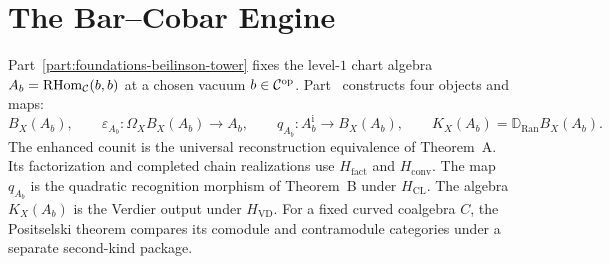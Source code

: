 \documentclass[11pt]{memoir}
\providecommand{\op}{\mathrm{op}}
\begin{document}






%
%
%
%

\part{The Bar–Cobar Engine}
\label{part:bar-cobar-engine}%
\label{part:bar-complex}%
\label{chap:bar-complex}%

\noindent
Part~\ref{part:foundations-beilinson-tower} fixes the level-$1$ chart
algebra
$A_b=\operatorname{RHom}_{\mathcal{C}}(b,b)$ at a chosen vacuum
$b\in\cC^{\op}$.  Part~\ref{part:bar-cobar-engine} constructs four
objects and maps:
\[
 B_X(A_b),\qquad
 \varepsilon_{A_b}\colon\Omega_XB_X(A_b)\to A_b,\qquad
 q_{A_b}\colon A_b^{\mathrm i}\to B_X(A_b),\qquad
 K_X(A_b)=\mathbb D_{\operatorname{Ran}}B_X(A_b).
\]
The enhanced counit is the universal reconstruction equivalence of
Theorem~A.  Its factorization and completed chain realizations use
$H_{\mathrm{fact}}$ and $H_{\mathrm{conv}}$.  The map $q_{A_b}$ is
the quadratic recognition morphism of Theorem~B under
$H_{\mathrm{CL}}$.  The algebra $K_X(A_b)$ is the Verdier output
under $H_{\mathrm{VD}}$.  For a fixed curved coalgebra $C$, the
Positselski theorem compares its comodule and contramodule categories
under a separate second-kind package.
\end{document}
